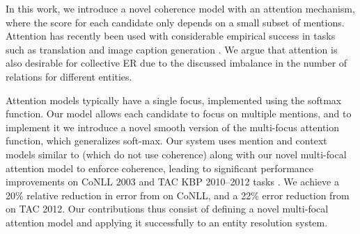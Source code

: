 


In this work, we introduce a novel coherence model with an attention mechanism, where the 
score for each candidate only depends on a small subset of mentions.
 Attention has recently been
used with considerable empirical success in tasks such as translation
\cite{bahdanau2014neural} and image caption generation
\cite{xu2015show}. We argue that attention is also desirable for
collective ER due to the discussed imbalance in the number of
relations for different entities.

Attention models typically have a single focus, implemented using the
 softmax function. Our model allows each candidate to
 focus on multiple mentions, and to implement it we introduce a 
 novel smooth version of the
 multi-focus attention function, which generalizes soft-max.
Our system uses mention and context models similar to  
 (which do not use coherence) along with our novel 
multi-focal attention model to 
enforce coherence, leading to significant performance improvements
on CoNLL 2003 \cite{Hoffart2011} and TAC KBP 2010--2012 tasks \cite{TAC2010,TAC2011,TAC2012}.
We achieve a 20\% relative reduction
in error from  on CoNLL, and a 
22\% error reduction from  on TAC 2012.
Our contributions thus consist of defining a novel multi-focal
attention model and applying it
successfully to an entity resolution system.





